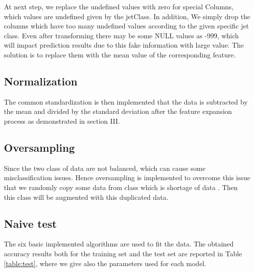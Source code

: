 \documentclass[letterpaper, 10 pt, conference]{ieeeconf}  %
\begin{document}
At next step, we replace the undefined values with zero for special Columns, which values are undefined given by the jetClass. In addition,
We simply drop the columns which have too many undefined values according to the given specific jet class.
Even after transforming there may be some NULL values as -999, which  will  impact
prediction  results  due  to  this  fake  information  with  large value. The solution is to replace them with the mean value of the corresponding feature.

\subsection{Normalization}
The common standardization is then implemented that the data is subtracted by the mean and divided by the standard deviation after the feature expansion process as demonstrated in section III.\\ 

\subsection{Oversampling}
Since the two class of data are not balanced, which can cause some misclassification issues. Hence oversampling is implemented to overcome this issue that we randomly copy some data from class which is shortage of data . Then this class will be augmented with this duplicated data.

\subsection{Naive test}
The six basic implemented algorithms are used to fit the data. 
The obtained accuracy results both for the training set and the test set are reported in Table \ref{table:test}, where we give also the parameters used for each model. 

\end{document}
